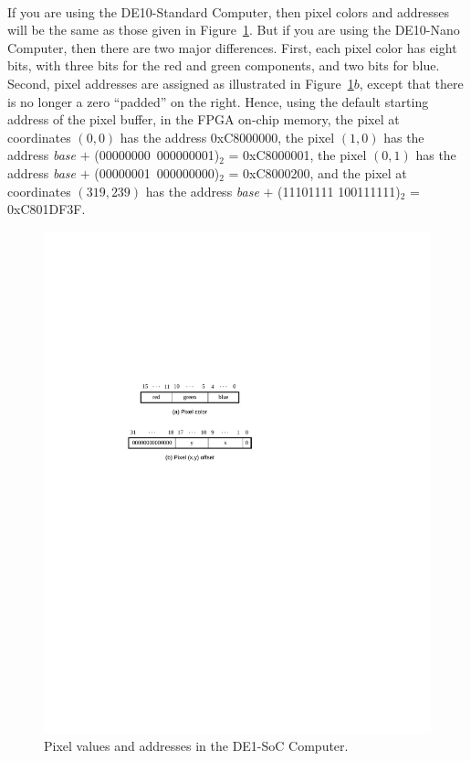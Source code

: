 \documentclass[epsfig,10pt,fullpage]{article}
\begin{document}
~\\
\noindent
If you are using the DE10-Standard Computer, then pixel colors and addresses will be the same
as those given in Figure~\ref{fig:pixels}. But if you are using the DE10-Nano Computer,
then there are two major differences. First, each pixel color has eight bits, with three bits for
the red and green components, and two bits for blue. Second, pixel addresses are 
assigned as illustrated in Figure~\ref{fig:pixels}$b$, except that there is no longer a zero
``padded'' on the right. Hence, using the default starting address of the pixel buffer, in the 
FPGA on-chip memory, the pixel at coordinates $(0,0)$ has the address 
{\sf 0xC8000000}, the pixel $(1,0)$ 
has the address {\it base} $+$ (00000000~000000001)$_2$ = {\sf 0xC8000001}, the pixel $(0,1)$ 
has the address {\it base} $+$ (00000001~000000000)$_2$ = {\sf 0xC8000200}, and the pixel 
at coordinates $(319,239)$ has the address {\it base} $+$ (11101111 100111111)$_2$ =
{\sf 0xC801DF3F}. 

\begin{figure}[h!]
   \begin{center}
       \includegraphics{figures/fig_pixels.pdf}
   \end{center}
   \caption{Pixel values and addresses in the DE1-SoC Computer.}
	\label{fig:pixels}
\end{figure}
\end{document}
